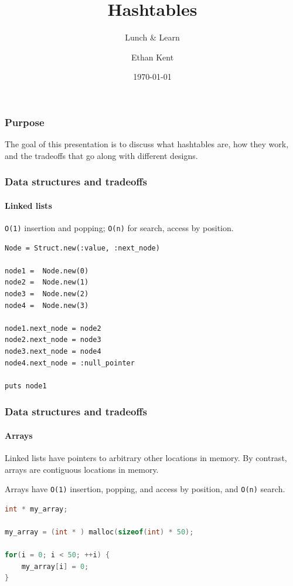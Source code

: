 \documentclass[aspectratio=169]{beamer}
\title{Hashtables}
\subtitle{Lunch \& Learn}
\author{Ethan Kent}
\date{\today}
\begin{document}
\frame{\titlepage}

\begin{frame}
    \frametitle{Purpose}

    The goal of this presentation is to discuss what hashtables are, how they
    work, and the tradeoffs that go along with different designs.
\end{frame}

\begin{frame}[fragile]
    \frametitle{Data structures and tradeoffs}
    \framesubtitle{Linked lists}

    \texttt{O(1)} insertion and popping; \texttt{O(n)} for search, access by
    position.

    \begin{lstlisting}
Node = Struct.new(:value, :next_node)

node1 =  Node.new(0)
node2 =  Node.new(1)
node3 =  Node.new(2)
node4 =  Node.new(3)

node1.next_node = node2
node2.next_node = node3
node3.next_node = node4
node4.next_node = :null_pointer

puts node1
    \end{lstlisting}
\end{frame}

\begin{frame}[fragile]
    \frametitle{Data structures and tradeoffs}
    \framesubtitle{Arrays}

    Linked lists have pointers to arbitrary other locations in memory. By
    contrast, arrays are contiguous locations in memory.

    \vspace{1em}

    Arrays have \texttt{O(1)} insertion, popping, and access by position, and
    \texttt{O(n)} search.

    \begin{lstlisting}[language=C]
int * my_array;

my_array = (int * ) malloc(sizeof(int) * 50);

for(i = 0; i < 50; ++i) {
    my_array[i] = 0;
}
    \end{lstlisting}

\end{frame}
\end{document}
